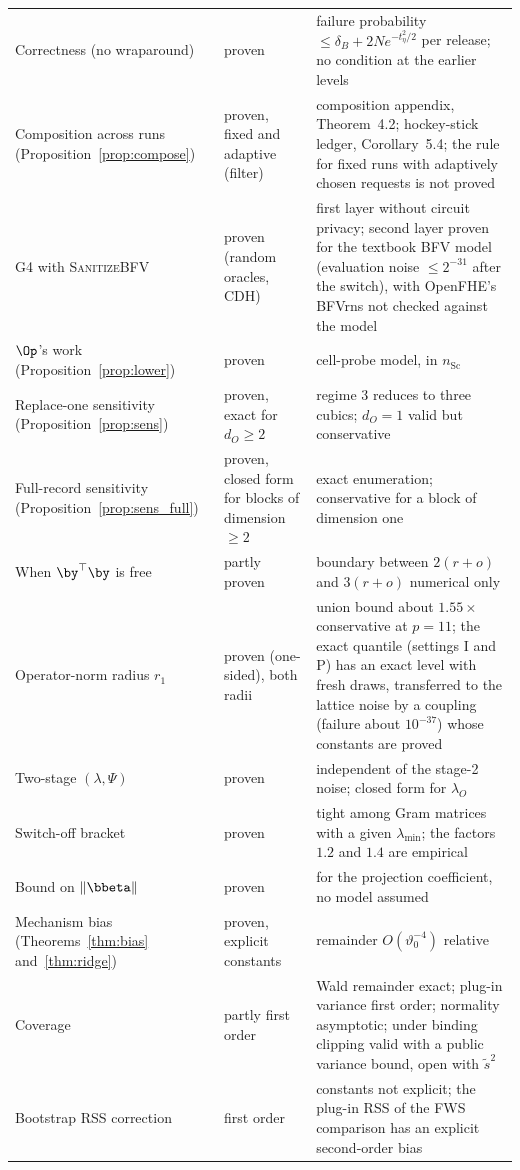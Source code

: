 {\begin{xltabular}{\textwidth}{@{}>{\raggedright\arraybackslash}p{4.4cm}>{\raggedright\arraybackslash}p{2.6cm}>{\raggedright\arraybackslash}X@{}}
Correctness (no wraparound) & proven & failure probability $\le \delta_B + 2Ne^{-t_\eta^2/2}$ per release; no condition at the earlier levels \\
Composition across runs (Proposition~\ref{prop:compose}) & proven, fixed and adaptive (filter) & composition appendix, Theorem~4.2; hockey-stick ledger, Corollary~5.4; the rule for fixed runs with adaptively chosen requests is not proved \\
G4 with \textsc{SanitizeBFV} & proven (random oracles, CDH) & first layer without circuit privacy; second layer proven for the textbook BFV model (evaluation noise $\le 2^{-31}$ after the switch), with OpenFHE's BFVrns not checked against the model \\
$\Op$'s work (Proposition~\ref{prop:lower}) & proven & cell-probe model, in $n_{\mathrm{Sc}}$ \\
Replace-one sensitivity (Proposition~\ref{prop:sens}) & proven, exact for $d_O \ge 2$ & regime 3 reduces to three cubics; $d_O = 1$ valid but conservative \\
Full-record sensitivity (Proposition~\ref{prop:sens_full}) & proven, closed form for blocks of dimension $\ge 2$ & exact enumeration; conservative for a block of dimension one \\
When $\by^\top\by$ is free & partly proven & boundary between $2(r + o)$ and $3(r + o)$ numerical only \\
Operator-norm radius $r_1$ & proven (one-sided), both radii & union bound about $1.55\times$ conservative at $p = 11$; the exact quantile (settings I and P) has an exact level with fresh draws, transferred to the lattice noise by a coupling (failure about $10^{-37}$) whose constants are proved \\
Two-stage $(\lambda, \Psi)$ & proven & independent of the stage-2 noise; closed form for $\lambda_O$ \\
Switch-off bracket & proven & tight among Gram matrices with a given $\lambda_{\min}$; the factors $1.2$ and $1.4$ are empirical \\
Bound on $\|\bbeta\|$ & proven & for the projection coefficient, no model assumed \\
Mechanism bias (Theorems~\ref{thm:bias} and~\ref{thm:ridge}) & proven, explicit constants & remainder $O(\vartheta_0^{-4})$ relative \\
Coverage & partly first order & Wald remainder exact; plug-in variance first order; normality asymptotic; under binding clipping valid with a public variance bound, open with $\tilde s^2$ \\
Bootstrap RSS correction & first order & constants not explicit; the plug-in RSS of the FWS comparison has an explicit second-order bias \\
\bottomrule
\end{xltabular}}

